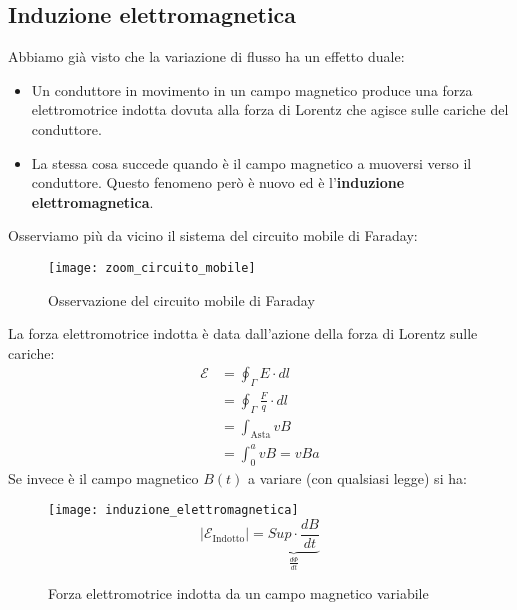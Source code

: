 \documentclass[a4paper]{article}
\begin{document}
\subsection{Induzione elettromagnetica}
Abbiamo già visto che la variazione di flusso ha un effetto duale:
\begin{itemize}
  \item 
    Un conduttore in movimento in un campo magnetico produce una
    forza elettromotrice indotta dovuta alla forza di Lorentz che agisce sulle cariche
    del conduttore.

  \item La stessa cosa succede quando è il campo magnetico
    a muoversi verso il conduttore. Questo fenomeno però è nuovo ed è l'\textbf{induzione
    elettromagnetica}.
\end{itemize}
Osserviamo più da vicino il sistema del circuito mobile di Faraday:
\begin{figure}[H]
  \centering
  \texttt{[image: zoom\_circuito\_mobile]}
  \caption{Osservazione del circuito mobile di Faraday}
\end{figure}
\noindent
La forza elettromotrice indotta è data dall'azione della forza di Lorentz sulle cariche:
\[
  \begin{aligned}
    \mathcal{E} &= \oint_{\Gamma} E \cdot dl\\
                &= \oint_{\Gamma} \frac{F}{q} \cdot dl\\
                &= \int_{\text{Asta}} vB\\
                &= \int_0^a vB = vBa
  \end{aligned}
\] 
Se invece è il campo magnetico \( B(t) \) a variare (con qualsiasi legge) si ha:
\begin{figure}[H]
  \centering
  \texttt{[image: induzione\_elettromagnetica]}
  \[
    |\mathcal{E}_{\text{Indotto}}| = \underbrace{Sup \cdot \frac{dB}{dt}}_{\frac{d \Phi }{dt}}
  \] 
  \caption{Forza elettromotrice indotta da un campo magnetico variabile}
\end{figure}
\end{document}

